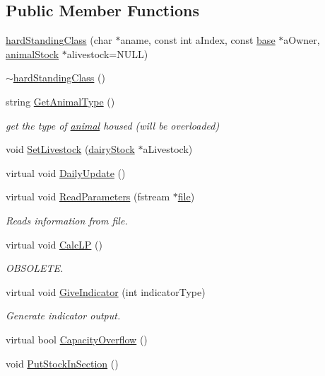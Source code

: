 \subsection*{Public Member Functions}
\begin{DoxyCompactItemize}
\item 
\hyperlink{classhard_standing_class_a9bd9a22eddef5eaa90c3035c65fe1dd2}{hardStandingClass} (char $\ast$aname, const int aIndex, const \hyperlink{classbase}{base} $\ast$aOwner, \hyperlink{classanimal_stock}{animalStock} $\ast$alivestock=NULL)
\item 
\hyperlink{classhard_standing_class_af7253b376b9969d983126583cec5504b}{$\sim$hardStandingClass} ()
\item 
string \hyperlink{classhard_standing_class_a3fb5297a67e0d2af40b940c22e2d2408}{GetAnimalType} ()
\begin{DoxyCompactList}\small\item\em get the type of \hyperlink{classanimal}{animal} housed (will be overloaded) \item\end{DoxyCompactList}\item 
void \hyperlink{classhard_standing_class_aa54411fdc0bdbf3e4cb043ca1b0ce765}{SetLivestock} (\hyperlink{classdairy_stock}{dairyStock} $\ast$aLivestock)
\item 
virtual void \hyperlink{classhard_standing_class_ac182354be245579d4b8ec936add0c0be}{DailyUpdate} ()
\item 
virtual void \hyperlink{classhard_standing_class_a87b03d8140b5d5913fc8e79cc8229410}{ReadParameters} (fstream $\ast$\hyperlink{classbase_a3af52ee9891719d09b8b19b42450b6f6}{file})
\begin{DoxyCompactList}\small\item\em Reads information from file. \item\end{DoxyCompactList}\item 
virtual void \hyperlink{classhard_standing_class_a03f3703e524d927cbf930e47bebd846d}{CalcLP} ()
\begin{DoxyCompactList}\small\item\em OBSOLETE. \item\end{DoxyCompactList}\item 
virtual void \hyperlink{classhard_standing_class_a2a5c5d0905de0042918e0829e24145a3}{GiveIndicator} (int indicatorType)
\begin{DoxyCompactList}\small\item\em Generate indicator output. \item\end{DoxyCompactList}\item 
virtual bool \hyperlink{classhard_standing_class_a458d101f2c4346d2e019d284f273181b}{CapacityOverflow} ()
\item 
void \hyperlink{classhard_standing_class_af7a8835dd1b368aa443af8f9ad7fd677}{PutStockInSection} ()
\end{DoxyCompactItemize}


